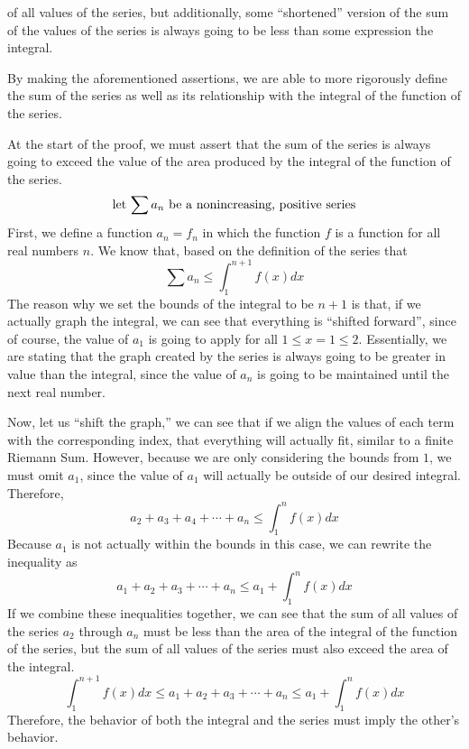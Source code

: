 \documentclass{report}
\begin{document}
\begin{sloppypar}
\begin{itemize}
        of all values of the series, but
        additionally, some ``shortened''
        version of the sum of the values
        of the series
        is always going to be less than
        some expression the integral.
\end{itemize}
By making the aforementioned assertions, we
are able to more rigorously define the
sum of the series as well as its relationship
with the integral of the function of the series.
\par At the start of the proof, we must assert
that the sum of the series is always going to
exceed the value of the area produced by the
integral of the function of the series.
\[ \textrm{let $ \sum a_{n} $ be a nonincreasing,
    positive series}\]
First, we define a function $ a_{n} = f_{n} $
in which the function $ f $ is a function
for all real numbers $ n $. We know that,
based on the definition of the series that
\[ \sum a_{n} \leq \int_{1}^{n+1} f(x)dx\]
The reason why we set the bounds of the
integral to be $ n + 1 $ is that, if we
actually graph the integral, we can
see that everything is ``shifted forward'',
since of course, the value of $ a_{1}$ is
going to apply for all $ 1 \leq x = 1 \leq 2 $.
Essentially, we are stating that the
graph created by the series is always going to
be greater in value than the integral,
since the value of $ a_{n}$ is going to be
maintained until the next real number.
\par Now, let us ``shift the graph,'' we can
see that if we align the values of
each term with the corresponding index,
that everything will actually fit, similar
to a finite Riemann Sum. However,
because we are only considering the
bounds from $ 1 $, we must omit
$ a_{1}$, since the value of $ a_{1}$
will actually be outside of our
desired integral. Therefore,
\[ a_{2} + a_{3} + a_{4} + \cdots + a_{n}\leq
  \int_{1}^{n} f(x)dx \]
Because $ a_{1}$ is not actually within
the bounds in this case,
we can rewrite the inequality as
\[ a_{1} + a_{2} + a_{3} + \cdots + a_{n} \leq
a_{1} + \int_{1}^{n} f(x)dx \]
If we combine these inequalities together,
we can see that the sum of all values of the series
$a_{2}$ through $ a_{n}$ must be less than the area
of the integral of the function of the series,
but the sum of all values of the series
must also exceed the area of the integral.
\[ \int_{1}^{n+1} f(x)dx \leq a_{1} + a_{2} +
  a_{3} + \cdots + a_{n} \leq a_{1} + \int_{1}^{n} f(x) dx\]
Therefore, the behavior of both the integral
and the series must imply the other's behavior.
\begin{itemize}

\end{itemize}
\end{sloppypar}
\end{document}
